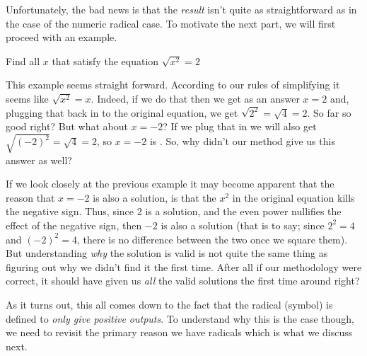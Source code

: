 \documentclass{ximera}
\begin{document}
    Unfortunately, the bad news is that the \textit{result} isn't quite as straightforward as in the case of the numeric radical case. To motivate the next part, we will first proceed with an example.

    \begin{problem}
        Find all $x$ that satisfy the equation $\sqrt{x^2} = 2$%
        
        This example seems straight forward. According to our rules of simplifying it seems like $\sqrt{x^2} = x$. Indeed, if we do that then we get as an answer $x = 2$ and, plugging that back in to the original equation, we get $\sqrt{2^2} = \sqrt{4} = 2$. So far so good right? But what about $x = -2$? If we plug that in we will also get $\sqrt{(-2)^2} = \sqrt{4} = 2$, so $x = -2$ is . So, why didn't our method give us this answer as well?
    \end{problem}%

    If we look closely at the previous example it may become apparent that the reason that $x = -2$ is also a solution, is that the $x^2$ in the original equation kills the negative sign. Thus, since $2$ is a solution, and the even power nullifies the effect of the negative sign, then $-2$ is also a solution (that is to say; since $2^2 = 4$ and $(-2)^2 = 4$, there is no difference between the two once we square them). But understanding \textit{why} the solution is valid is not quite the same thing as figuring out why we didn't find it the first time. After all if our methodology were correct, it should have given us \textit{all} the valid solutions the first time around right?

    As it turns out, this all comes down to the fact that the radical (symbol) is defined to \textit{only give positive outputs}. To understand why this is the case though, we need to revisit the primary reason we have radicals which is what we discuss next.
\end{document}
